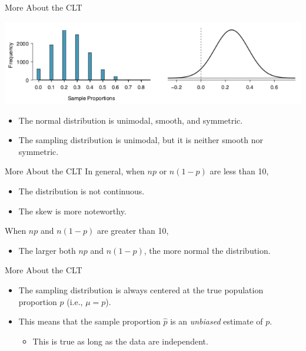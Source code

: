 \begin{frame}{More About the CLT}
    \begin{center}
        \includegraphics[scale=0.5]{images/sampdist2.png}
    \end{center}
    \begin{itemize}
        \item The normal distribution is unimodal, smooth, and symmetric.
        \item The sampling distribution is unimodal, but it is neither smooth nor symmetric.
    \end{itemize}
\end{frame}

\begin{frame}{More About the CLT}
    In general, when $np$ or $n(1-p)$ are less than 10,
    \begin{itemize}
        \item The distribution is not continuous.
        \item The skew is more noteworthy.
    \end{itemize}
    When $np$ and $n(1-p)$ are greater than 10,
    \begin{itemize}
        \item The larger both $np$ and $n(1−p)$, the more normal the distribution.
    \end{itemize}
\end{frame}

\begin{frame}{More About the CLT}
    \begin{itemize}
        \item The sampling distribution is always centered at the true population proportion $p$ (i.e., $\mu=p$).
        \item This means that the sample proportion $\hat{p}$ is an \textit{unbiased} estimate of $p$.
        \begin{itemize}
            \item This is true as long as the data are independent.
        \end{itemize}
    \end{itemize} 
\end{frame}

